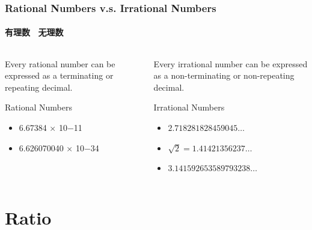 \documentclass[
	11pt, %
	handout,
]{beamer}
\begin{document}
\begin{frame}
\frametitle{Rational Numbers v.s. Irrational Numbers}
\framesubtitle{有理数 \ 无理数}

	  \begin{columns}[t] %
			\begin{column}{0.45\textwidth} %
							\begin{theorem}
								Every rational number can be expressed as a terminating or repeating decimal.
							\end{theorem}

						\begin{exampleblock}{Rational Numbers}
								\begin{itemize}
									\item 6.67384 × 10−11
									\item 6.626070040 × 10−34
								\end{itemize}							
						\end{exampleblock}
			\end{column}

			\begin{column}{0.5\textwidth} %
							\begin{theorem}
												Every irrational number can be expressed as a non-terminating or non-repeating decimal.
							\end{theorem}
			\begin{exampleblock}{Irrational Numbers}
								\begin{itemize}
									\item $2.718281828459045\ldots$
									\item $\sqrt{2} = 1.41421356237 \ldots$
									\item $3.141592653589793238 \ldots$
								\end{itemize}	
			\end{exampleblock}
			\end{column}
	\end{columns}
\end{frame}


\section{Ratio}
\end{document}
